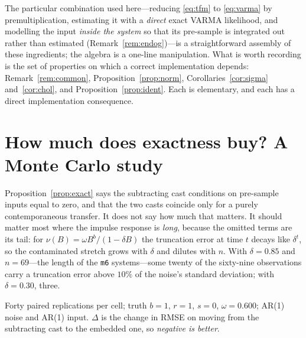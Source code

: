 \documentclass[11pt,a4paper]{article}
\theoremstyle{plain}
\theoremstyle{remark}
\begin{document}
The particular combination used here---reducing \eqref{eq:tfm} to \eqref{eq:varma}
by premultiplication, estimating it with a \emph{direct} exact VARMA likelihood, and
modelling the input \emph{inside the system} so that its pre-sample is integrated out
rather than estimated (Remark~\ref{rem:endog})---is a straightforward assembly of
these ingredients; the algebra is a one-line manipulation. What is worth recording is
the set of properties on which a correct implementation depends:
Remark~\ref{rem:common}, Proposition~\ref{prop:norm},
Corollaries~\ref{cor:sigma} and~\ref{cor:chol}, and Proposition~\ref{prop:ident}.
Each is elementary, and each has a direct implementation consequence.


\section{How much does exactness buy? A Monte Carlo study}
\label{sec:mcstudy}

Proposition~\ref{prop:exact} says the subtracting cast conditions on pre-sample
inputs equal to zero, and that the two casts coincide only for a purely
contemporaneous transfer. It does not say how much that matters. It should matter
most where the impulse response is \emph{long}, because the omitted terms are its
tail: for $\nu(B)=\omega B^{b}/(1-\delta B)$ the truncation error at time $t$ decays
like $\delta^{t}$, so the contaminated stretch grows with $\delta$ and dilutes with
$n$. With $\delta=0.85$ and $n=69$---the length of the \texttt{m6} systems---some
twenty of the sixty-nine observations carry a truncation error above $10\%$ of the
noise's standard deviation; with $\delta=0.30$, three.

Forty paired replications per cell; truth $b=1$, $r=1$, $s=0$, $\omega=0.600$;
AR(1) noise and AR(1) input. $\Delta$ is the change in RMSE on moving from the
subtracting cast to the embedded one, so \emph{negative is better}.
\end{document}

